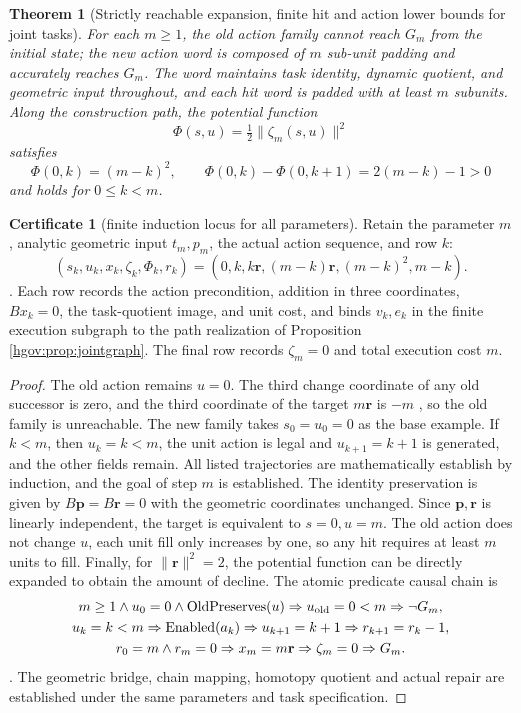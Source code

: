 \documentclass[12pt,a4paper,openany,notitlepage]{report}
\theoremstyle{plain}
\newtheorem{theorem}{Theorem}[chapter]
\theoremstyle{definition}
\newtheorem*{certificate}{Certificate}
\theoremstyle{remark}
\begin{document}
\begin{CJK*}
\begin{theorem}
[Strictly reachable expansion, finite hit and action lower bounds for joint tasks]\label{hgov:thm:joint}
For each $m\ge1$, the old action family cannot reach $G_m$ from the initial state; the new action word is composed of $m$ sub-unit padding and accurately reaches $G_m$. The word maintains task identity, dynamic quotient, and geometric input throughout, and each hit word is padded with at least $m$ subunits. Along the construction path, the potential function \[
\Phi(s,u)=\tfrac12\|\zeta_m(s,u)\|^2
\] satisfies \[
\Phi(0,k)=(m-k)^2,\qquad
\Phi(0,k)-\Phi(0,k+1)=2(m-k)-1>0
\] and holds for $0\le k<m$.\end{theorem}
\begin{certificate}
[finite induction locus for all parameters]Retain the parameter $m$, analytic geometric input $t_m,p_m$, the actual action sequence, and row $k$:
\[
(s_k,u_k,x_k,\zeta_k,\Phi_k,r_k)
=(0,k,k\mathbf r,(m-k)\mathbf r,(m-k)^2,m-k).
\].
Each row records the action precondition, addition in three coordinates, $Bx_k=0$, the task-quotient image, and unit cost, and binds $v_k,e_k$ in the finite execution subgraph to the path realization of Proposition ~ \ref{hgov:prop:jointgraph}. The final row records $\zeta_m=0$ and total execution cost $m$.\end{certificate}
\begin{proof}
The old action remains $u=0$. The third change coordinate of any old successor is zero, and the third coordinate of the target $m\mathbf r$ is $-m$ , so the old family is unreachable. The new family takes $s_0=u_0=0$ as the base example. If $k<m$, then $u_k=k<m$, the unit action is legal and $u_{k+1}=k+1$ is generated, and the other fields remain. All listed trajectories are mathematically establish by induction, and the goal of step $m$ is established. The identity preservation is given by $B\mathbf p=B\mathbf r=0$ with the geometric coordinates unchanged. Since $\mathbf p,\mathbf r$ is linearly independent, the target is equivalent to $s=0,u=m$. The old action does not change $u$, each unit fill only increases by one, so any hit requires at least $m$ units to fill. Finally, for $\|\mathbf r\|^2=2$, the potential function can be directly expanded to obtain the amount of decline. The atomic predicate causal chain is \[
\begin{gathered}
m\ge1\land u_0=0\land
\operatorname{OldPreserves}(u)
\Rightarrow u_{\rm old}=0<m
\Rightarrow\neg G_m,\\
u_k=k<m
\Rightarrow\operatorname{Enabled}(a_k)
\Rightarrow u_{k+1}=k+1
\Rightarrow r_{k+1}=r_k-1,\\
r_0=m\land r_m=0
\Rightarrow x_m=m\mathbf r
\Rightarrow\zeta_m=0
\Rightarrow G_m .
\end{gathered}
\]. The geometric bridge, chain mapping, homotopy quotient and actual repair are established under the same parameters and task specification.\end{proof}



\end{CJK*}
\end{document}
